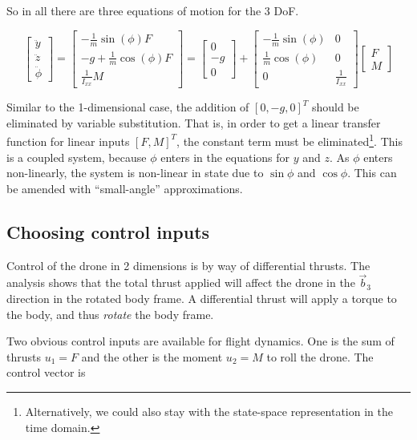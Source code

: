 \documentclass[a4paper]{report}
\begin{document}
So in all there are three equations of motion for the 3 \gls{DoF}.

\begin{equation}
\begin{bmatrix}
\ddot{y} \\
\ddot{z} \\
\ddot{\phi}
\end{bmatrix}
=
\begin{bmatrix}
  -\frac{1}{m}\sin(\phi) F\\
  -g + \frac{1}{m}\cos(\phi) F \\
  \frac{1}{I_{xx}} M
\end{bmatrix} 
=
\begin{bmatrix}
 0\\
 -g \\
 0
\end{bmatrix} +
\begin{bmatrix}
  -\frac{1}{m}\sin(\phi) & 0\\
  \frac{1}{m}\cos(\phi) & 0 \\
  0 & \frac{1}{I_{xx}}
\end{bmatrix} 
\begin{bmatrix}
 F \\
 M
\end{bmatrix} 
\end{equation}

Similar to the 1-dimensional case, the addition of $\left[ 0, -g, 0 \right]^T$ should be eliminated by variable substitution.
That is, in order to get a linear transfer function for linear inputs $\left[ F, M \right]^T$, the constant term must be eliminated\footnote{
Alternatively, we could also stay with the state-space representation in the time domain.}.
This is a coupled system, because $\phi$ enters in the equations for $y$ and $z$.
As $\phi$ enters non-linearly, the system is non-linear in state due to $\sin\phi$ and $\cos\phi$.
This can be amended with ``small-angle'' approximations.

\subsection{Choosing control inputs}
Control of the drone in 2 dimensions is by way of differential thrusts.
The analysis shows that the total thrust applied will affect the drone in the $\vec{b}_3$ direction in the rotated body frame.
A differential thrust will apply a torque to the body, and thus \textit{rotate} the body frame. 

Two obvious control inputs are available for flight dynamics. One is the sum of thrusts $u_1 = F$ and the other is the moment $u_2 = M$ to roll the drone. The control vector is
\end{document}
